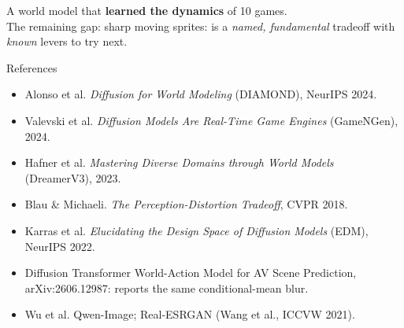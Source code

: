 \documentclass[aspectratio=169,11pt]{beamer}
\begin{document}
%
\begin{frame}[standout]
  A world model that \textbf{learned the dynamics} of 10 games.\\[0.4em]
  \normalsize
  The remaining gap: sharp moving sprites: is a
  \emph{named, fundamental} tradeoff with \emph{known} levers to try next.
\end{frame}

\begin{frame}{References}
  \footnotesize
  \begin{itemize}
    \item Alonso et al. \emph{Diffusion for World Modeling} (DIAMOND), NeurIPS 2024.
    \item Valevski et al. \emph{Diffusion Models Are Real-Time Game Engines}
          (GameNGen), 2024.
    \item Hafner et al. \emph{Mastering Diverse Domains through World Models}
          (DreamerV3), 2023.
    \item Blau \& Michaeli. \emph{The Perception-Distortion Tradeoff}, CVPR 2018.
    \item Karras et al. \emph{Elucidating the Design Space of Diffusion Models}
          (EDM), NeurIPS 2022.
    \item Diffusion Transformer World-Action Model for AV Scene Prediction,
          arXiv:2606.12987: reports the same conditional-mean blur.
    \item Wu et al. Qwen-Image; Real-ESRGAN (Wang et al., ICCVW 2021).
  \end{itemize}
\end{frame}
\end{document}
